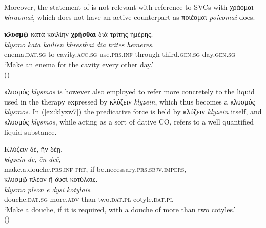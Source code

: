 \documentclass[output=paper,colorlinks,citecolor=brown]{langscibook}
\begin{document}
Moreover, the statement of \citet{Marini2010} is not relevant with reference to SVCs with χράομαι \textit{khraomai}, which does not have an active counterpart as ποιέομαι \textit{poieomai} does.


\begin{exe}
\ex\label{ex:klyzw6}
\glll \textbf{κλυσμῷ} κατὰ κοιλίην \textbf{χρῆσθαι} διὰ τρίτης ἡμέρης. \\ 
\textit{klysmō} \textit{kata} \textit{koiliēn} \textit{khrēsthai} \textit{dia} \textit{tritēs} \textit{hēmerēs}. \\
enema.\textsc{dat.sg} to cavity.\textsc{acc.sg} use.\textsc{prs.inf} through third.\textsc{gen.sg} day.\textsc{gen.sg} \\
\glt ‘Make an enema for the cavity every other day.' \\
\hspace*{\fill}()
\end{exe}


κλυσμός \textit{klysmos} is however also employed to refer more concretely to the liquid used in the therapy expressed by κλύζειν \textit{klyzein}, which thus becomes a κλυσμός \textit{klysmos}. In (\ref{ex:klyzw7}) the predicative force is held by κλύζειν \textit{klyzein} itself, and κλυσμός \textit{klysmos}, while acting as a sort of dative CO, refers to a well quantified liquid substance. 

\begin{exe}
\ex\label{ex:klyzw7}
\glll Κλύζειν δέ, ἢν δέῃ,  \\ 
\textit{klyzein} \textit{de}, \textit{ēn} \textit{deē},  \\
make.a.douche.\textsc{prs.inf} \textsc{prt}, if be.necessary.\textsc{prs.sbjv.impers}, \\

\glll κλυσμῷ πλέον ἢ δυσὶ κοτύλαις. \\
\textit{klysmō} \textit{pleon} \textit{ē} \textit{dysi} \textit{kotylais}. \\
douche.\textsc{dat.sg} more.\textsc{adv} than two.\textsc{dat.pl} cotyle.\textsc{dat.pl} \\
\glt ‘Make a douche, if it is required, with a douche of more than two cotyles.' \\
\hspace*{\fill}()
\end{exe}
\end{document}

